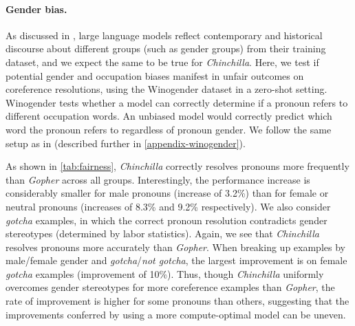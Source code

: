\documentclass[11pt, a4paper, logo, copyright, nonumbering]{deepmind}
\newcommand{\gopher}{\textit{Gopher}\xspace}
\newcommand{\chinchilla}{\textit{Chinchilla}\xspace}
\begin{document}
\paragraph{Gender bias.}
As discussed in \citet{rae2021gopher}, large language models reflect contemporary and historical discourse about different groups (such as gender groups) from their training dataset, and we expect the same to be true for \chinchilla. 
Here, we test if potential gender and occupation biases manifest in unfair outcomes on coreference resolutions, using the Winogender dataset \citep{rudinger2018gender} in a zero-shot setting.
Winogender tests whether a model can correctly determine if a pronoun refers to different occupation words.
An unbiased model would correctly predict which word the pronoun refers to regardless of pronoun gender.
 We follow the same setup as in \citet{rae2021gopher} (described further in \autoref{appendix-winogender}).

As shown in \autoref{tab:fairness}, \chinchilla correctly resolves pronouns more frequently than \gopher across all groups.  
Interestingly, the performance increase is considerably smaller for male pronouns (increase of 3.2\%) than for female or neutral pronouns (increases of 8.3\% and 9.2\% respectively). We also consider \textit{gotcha} examples, in which the correct pronoun resolution contradicts gender stereotypes (determined by labor statistics).  Again, we see that \chinchilla resolves pronouns more accurately than \gopher.  When breaking up examples by male/female gender and \textit{gotcha}/\textit{not gotcha}, the largest improvement is on female \textit{gotcha} examples (improvement of 10\%).
Thus, though \chinchilla uniformly overcomes gender stereotypes for more coreference examples than \gopher, the rate of improvement is higher for some pronouns than others, suggesting that the improvements conferred by using a more compute-optimal model can be uneven.
\end{document}
